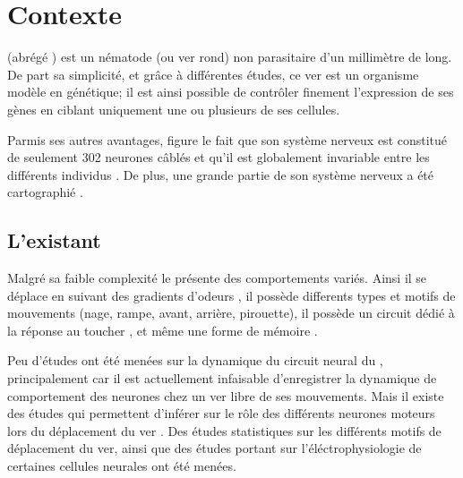 \chapter{Contexte} %
\label{cha:Contexte}

\caeleg{} (abrégé \celeg{}) est un nématode (ou ver rond) non parasitaire d'un millimètre de long.
De part sa simplicité, et grâce à différentes études, ce ver est un organisme modèle en génétique;
il est ainsi possible de contrôler finement l'expression de ses gènes en ciblant uniquement une ou
plusieurs de ses cellules.

Parmis ses autres avantages, figure le fait que son système nerveux est constitué de seulement 302
neurones câblés et qu'il est globalement invariable entre les différents individus \cite{Boyle2009}.
De plus, une grande partie de son système nerveux a été cartographié
\cite{Durbin1987,Gray2005,Boyle2009,Varshney2011}.

\section{L'existant} %
\label{sec:L'existant}

Malgré sa faible complexité le \celeg{} présente des comportements variés. Ainsi il se déplace
en suivant des gradients d'odeurs \cite{Ferree1999,Gray2005}, il possède differents types et
motifs de mouvements (nage, rampe, avant, arrière, pirouette), il possède un circuit dédié à la 
réponse au toucher \cite{Chalfie1985}, et même une forme de mémoire \cite{Rankin2005a}.

Peu d'études ont été menées sur la dynamique du circuit neural du \celeg{}, principalement
car il est actuellement infaisable d'enregistrer la dynamique de comportement des neurones
chez un ver libre de ses mouvements.
Mais il existe des études qui permettent d'inférer sur le rôle des différents neurones moteurs
lors du déplacement du ver \cite{Yanik2006,Chronis2007,Leifer2011}.
Des études statistiques sur les différents motifs de déplacement \cite{Gray2005} du ver, ainsi que
des études portant sur l'éléctrophysiologie de certaines cellules neurales \cite{Mellem2008a,Lockery2009} ont été menées.


